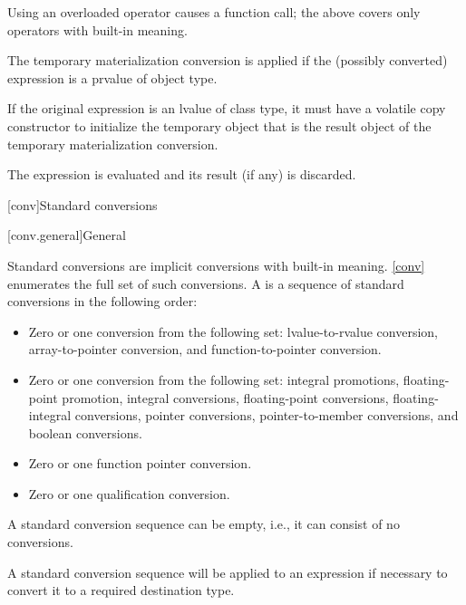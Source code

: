 \begin{note}
Using an overloaded operator causes a function call; the
above covers only operators with built-in meaning.
\end{note}
The temporary materialization conversion is applied
if the (possibly converted) expression is a prvalue of object type.
\begin{note}
If the original expression is an lvalue of class type,
it must have a volatile copy constructor to initialize the temporary object
that is the result object of the temporary materialization conversion.
\end{note}
The expression is evaluated and its result (if any) is discarded.

[conv]{Standard conversions}

[conv.general]{General}

%

\pnum
{}%
%
Standard conversions are implicit conversions with built-in meaning.
\ref{conv} enumerates the full set of such conversions. A
 is a sequence of standard
conversions in the following order:

\begin{itemize}
\item Zero or one conversion from the following set: lvalue-to-rvalue
conversion, array-to-pointer conversion, and function-to-pointer
conversion.

\item Zero or one conversion from the following set: integral
promotions, floating-point promotion, integral conversions, floating-point
conversions, floating-integral conversions, pointer conversions,
pointer-to-member conversions, and boolean conversions.

\item Zero or one function pointer conversion.

\item Zero or one qualification conversion.
\end{itemize}

\begin{note}
A standard conversion sequence can be empty, i.e., it can consist of no
conversions.
\end{note}
A standard conversion sequence will be applied to
an expression if necessary to convert it to a required destination type.

